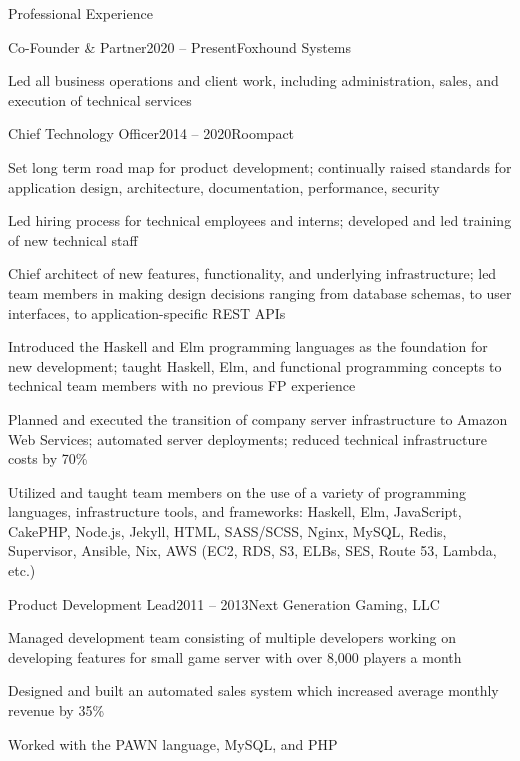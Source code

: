\documentclass{resume} %
\begin{document}

\begin{rSection}{Professional Experience}

\begin{rSubsection}{Co-Founder \& Partner}{2020 -- Present}{Foxhound Systems}{}
  \item Led all business operations and client work, including administration, sales, and execution of technical services
\end{rSubsection}


\begin{rSubsection}{Chief Technology Officer}{2014 -- 2020}{Roompact}{}
  \item Set long term road map for product development; continually raised standards for application design, architecture, documentation, performance, security
  \item Led hiring process for technical employees and interns; developed and led training of new technical staff
  \item Chief architect of new features, functionality, and underlying infrastructure; led team members in making design decisions ranging from database schemas,  to user interfaces, to application-specific REST APIs
  \item Introduced the Haskell and Elm programming languages as the foundation for new development; taught Haskell, Elm, and functional programming concepts to technical team members with no previous FP experience
  \item Planned and executed the transition of company server infrastructure to Amazon Web Services; automated server deployments; reduced technical infrastructure costs by 70\%
  \item Utilized and taught team members on the use of a variety of programming languages, infrastructure tools, and frameworks: Haskell, Elm, JavaScript, CakePHP, Node.js, Jekyll, HTML, SASS/SCSS, Nginx, MySQL, Redis, Supervisor, Ansible, Nix, AWS (EC2, RDS, S3, ELBs, SES, Route 53, Lambda, etc.)
\end{rSubsection}


\begin{rSubsection}{Product Development Lead}{2011 -- 2013}{Next Generation Gaming, LLC}{}
  \item Managed development team consisting of multiple developers working on developing features for small game server with over 8,000 players a month
  \item Designed and built an automated sales system which increased average monthly revenue by 35\%
  \item Worked with the PAWN language, MySQL, and PHP
\end{rSubsection}


\end{rSection}
\end{document}
